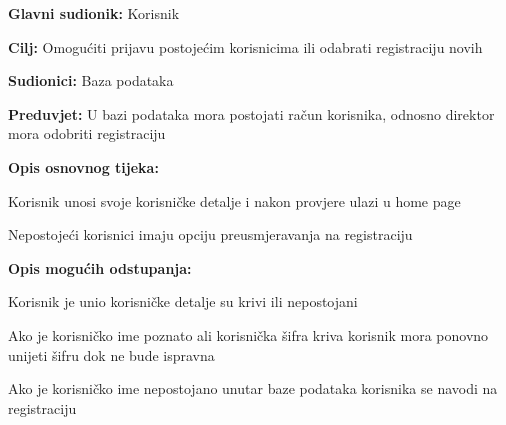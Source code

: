 				\noindent {}
				\begin{packed_item}
					
					\item \textbf{Glavni sudionik:} Korisnik
					\item  \textbf{Cilj:} Omogućiti prijavu postojećim korisnicima ili odabrati registraciju novih
					\item  \textbf{Sudionici:} Baza podataka
					\item  \textbf{Preduvjet:} U bazi podataka mora postojati račun korisnika, odnosno direktor mora odobriti registraciju
					\item  \textbf{Opis osnovnog tijeka:}
					
					\item[] \begin{packed_enum}
						
						\item Korisnik unosi svoje korisničke detalje i nakon provjere ulazi u home page
						\item Nepostojeći korisnici imaju opciju preusmjeravanja na registraciju
						
					\end{packed_enum}
					\item  \textbf{Opis mogućih odstupanja:}
					
					\item[] \begin{packed_item}
						
						\item[2.a] Korisnik je unio korisničke detalje su krivi ili nepostojani
						\item[] \begin{packed_enum}
							
							\item Ako je korisničko ime poznato ali korisnička šifra kriva korisnik mora ponovno unijeti šifru dok ne bude ispravna
							\item Ako je korisničko ime nepostojano unutar baze podataka korisnika se navodi na registraciju
						\end{packed_enum}
						
					\end{packed_item}					
				\end{packed_item}
				
